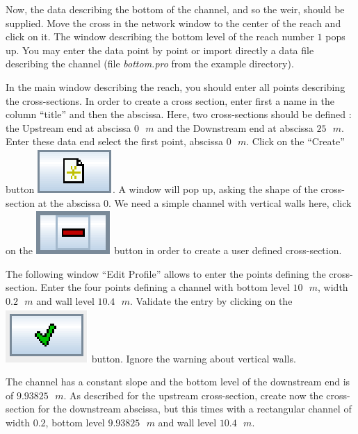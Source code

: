 \documentclass[a4paper,12pt]{article}
\begin{document}
Now, the data describing the bottom of the channel, and so the weir,
should be supplied. Move the cross in the network window to the center
of the reach and click on it. The window describing the bottom level
of the reach number $1$ pops up. You may enter the data point by point
or import directly a data file describing the channel (file \textit{bottom.pro}
from the example directory).

\vspace{0.5cm}

In the main window describing the reach, you should enter all points describing the cross-sections. In order
to create a cross section, enter first a name in the column {}``title''
and then the abscissa. Here, two cross-sections should be defined
: the Upstream end at abscissa $0\mbox{ }m$ and the Downstream end at abscissa
$25\mbox{ }m$. Enter these data end select the first point, abscissa $0\mbox{ }m$. Click
on the {}``Create'' button \includegraphics[scale=0.6]{new}.
A window will pop up, asking the shape of the cross-section at the
abscissa $0$. We need a simple channel with vertical walls here, click
on the \includegraphics[scale=0.6]{moins}
button in order to create a user defined cross-section. 

\vspace{0.5cm}

The following window {}``Edit Profile'' allows to enter the
points defining the cross-section. Enter the four points defining
a channel with bottom level $10\mbox{ }m$, width $0.2\mbox{ }m$ and wall level $10.4\mbox{ }m$.
Validate the entry by clicking on the \includegraphics[scale=0.6]{valid}
button. Ignore the warning about vertical walls.

\vspace{0.5cm}

The channel has a constant slope and the bottom level of the downstream
end is of $9.93825\mbox{ }m$. As described for the upstream cross-section, create
now the cross-section for the downstream abscissa, but this times
with a rectangular channel of width $0.2$, bottom level $9.93825\mbox{ }m$ and
wall level $10.4\mbox{ }m$.
\end{document}
